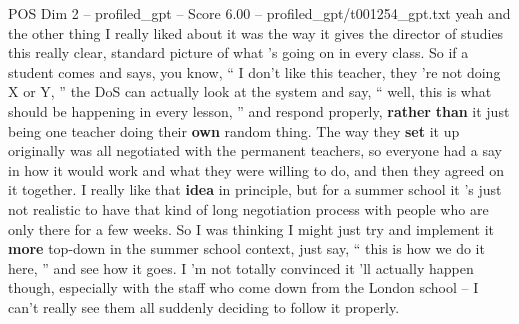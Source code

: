 \begin{textsample}{POS Dim 2 – profiled\_gpt – Score 6.00 – profiled\_gpt/t001254\_gpt.txt}  \label{ex:f2_pos_015}
yeah and the other thing I really liked about it was the way it gives the director of studies this really clear, standard picture of what ’s going on in every class.
So if a student comes and says, you know, “ I don't like this teacher, they ’re not doing X or Y, ” the DoS can actually look at the system and say, “ well, this is what should be happening in every lesson, ” and respond properly, \textbf{rather} \textbf{than} it just being one teacher doing their \textbf{own} random thing.
The way they \textbf{set} it up originally was all negotiated with the permanent teachers, so everyone had a say in how it would work and what they were willing to do, and then they agreed on it together.
I really like that \textbf{idea} in principle, but for a summer school it ’s just not realistic to have that kind of long negotiation process with people who are only there for a few weeks.
So I was thinking I might just try and implement it \textbf{more} top-down in the summer school context, just say, “ this is how we do it here, ” and see how it goes.
I ’m not totally convinced it ’ll actually happen though, especially with the staff who come down from the London school – I can't really see them all suddenly deciding to follow it properly.

\end{textsample}
